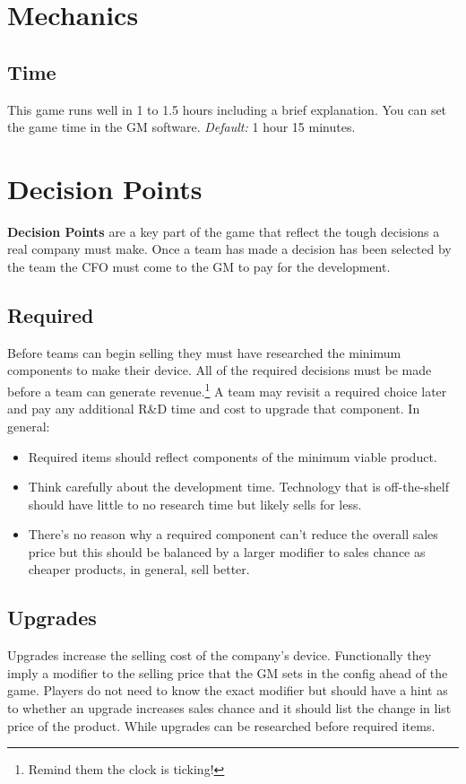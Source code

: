 \documentclass[a4paper]{article}
\begin{document}
\section{Mechanics}

\subsection{Time}

This game runs well in 1 to 1.5 hours including a brief explanation. You can set the game time in the GM software. \textit{Default:} 1 hour 15 minutes.


\section{Decision Points}
\textbf{Decision Points} are a key part of the game that reflect the tough decisions a real company must make. Once a team has made a decision has been selected by the team the CFO must come to the GM to pay for the development.
\subsection{Required}
Before teams can begin selling they must have researched the minimum components to make their device. All of the required decisions must be made before a team can generate revenue.\footnote{Remind them the clock is ticking!} A team may revisit a required choice later and pay any additional R\&D time and cost to upgrade that component.
In general:
\begin{itemize}
    \item Required items should reflect components of the minimum viable product.
    \item Think carefully about the development time. Technology that is off-the-shelf should have little to no research time but likely sells for less.
    \item There's no reason why a required component can't reduce the overall sales price but this should be balanced by a larger modifier to sales chance as cheaper products, in general, sell better.
\end{itemize}
\subsection{Upgrades}
Upgrades increase the selling cost of the company's device. Functionally they imply a modifier to the selling price that the GM sets in the config ahead of the game. Players do not need to know the exact modifier but should have a hint as to whether an upgrade increases sales chance and it should list the change in list price of the product. While upgrades can be researched before required items.
\end{document}
